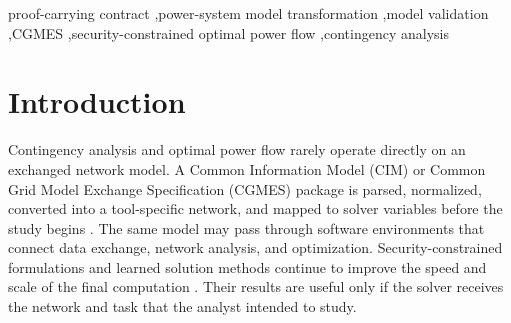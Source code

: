 \documentclass[preprint,12pt]{elsarticle}
\begin{document}
\begin{frontmatter}
\begin{abstract}
Power-system studies often pass network models through several conversions before contingency analysis or optimal power flow. A converted model can still be syntactically valid and solvable even when the conversion changes an asset, relation, parameter, or intervention needed by the study. This paper proposes proof-carrying contracts (PCC) to check that the converted model still represents the intended task before it is sent to a solver. The contract links source and target snapshots with authoritative asset relations and task-specific requirements. We evaluated PCC on 22 public networks and 1,980 transformations. It rejected all 1,320 harmful transformations and accepted all 660 lawful transformations. Simpler checks based on signatures, identity, task coverage, or attributes each missed at least one failure class. PCC also stopped all consequential cases in the AC N-1 and AC-OPF studies. For DC-SCOPF, it blocked 369 false-secure dispatches found across 50 operating states and 12,340 candidate outages. The corresponding median effects were 3.879 percentage points in N-1 loading, 5.96\% in AC-OPF cost, and 0.241 p.u. of DC-SCOPF loading excess. The main results were reproduced with PYPOWER/PIPS and Julia/PowerModels/HiGHS, and tests with CGMES data gave consistent decisions. These results show that PCC can prevent model-conversion errors from reaching power-system solvers.
\end{abstract}

\begin{keyword}
proof-carrying contract \sep power-system model transformation \sep model validation \sep CGMES \sep security-constrained optimal power flow \sep contingency analysis
\end{keyword}

\end{frontmatter}

\section{Introduction}

Contingency analysis and optimal power flow rarely operate directly on an exchanged network model. A Common Information Model (CIM) or Common Grid Model Exchange Specification (CGMES) package is parsed, normalized, converted into a tool-specific network, and mapped to solver variables before the study begins \citep{cgmes30,cim_grid_models_exchange,lara2021powersystems}. The same model may pass through software environments that connect data exchange, network analysis, and optimization. Security-constrained formulations and learned solution methods continue to improve the speed and scale of the final computation \citep{epsr2026_01,epsr2026_02}. Their results are useful only if the solver receives the network and task that the analyst intended to study.
\end{document}
